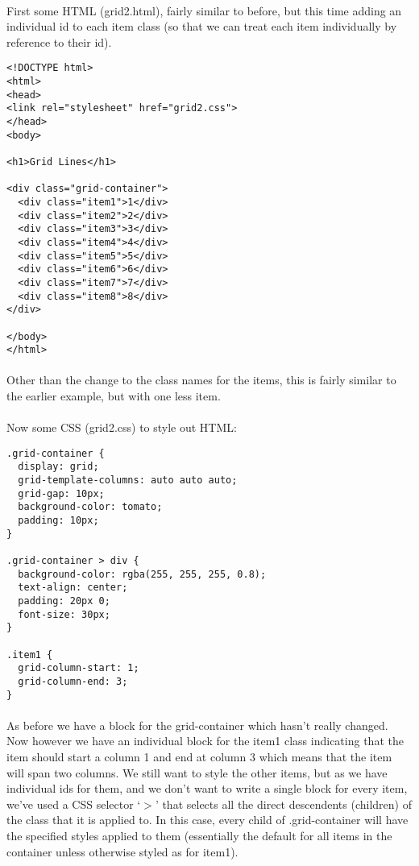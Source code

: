 \documentclass[10pt, a4paper, twosize]{article}
\begin{document}
\paragraph{} First some HTML (grid2.html), fairly similar to before, but this time adding an individual id to each item class (so that we can treat each item individually by reference to their id).
\begin{lstlisting}
<!DOCTYPE html>
<html>
<head>
<link rel="stylesheet" href="grid2.css">
</head>
<body>

<h1>Grid Lines</h1>

<div class="grid-container">
  <div class="item1">1</div>
  <div class="item2">2</div>
  <div class="item3">3</div>  
  <div class="item4">4</div>
  <div class="item5">5</div>
  <div class="item6">6</div>
  <div class="item7">7</div>
  <div class="item8">8</div>  
</div>

</body>
</html>
\end{lstlisting}
\paragraph{} Other than the change to the class names for the items, this is fairly similar to the earlier example, but with one less item.

\paragraph{} Now some CSS (grid2.css) to style out HTML:
\begin{lstlisting}
.grid-container {
  display: grid;
  grid-template-columns: auto auto auto;
  grid-gap: 10px;
  background-color: tomato;
  padding: 10px;
}

.grid-container > div {
  background-color: rgba(255, 255, 255, 0.8);
  text-align: center;
  padding: 20px 0;
  font-size: 30px;
}

.item1 {
  grid-column-start: 1;
  grid-column-end: 3;
}
\end{lstlisting}
\paragraph{} As before we have a block for the grid-container which hasn't really changed. Now however we have an individual block for the item1 class indicating that the item should start a column 1 and end at column 3 which means that the item will span two columns. We still want to style the other items, but as we have individual ids for them, and we don't want to write a single block for every item, we've used a CSS selector `$>$' that selects all the direct descendents (children) of the class that it is applied to. In this case, every child of .grid-container will have the specified styles applied to them (essentially the default for all items in the container unless otherwise styled as for item1).
\end{document}
